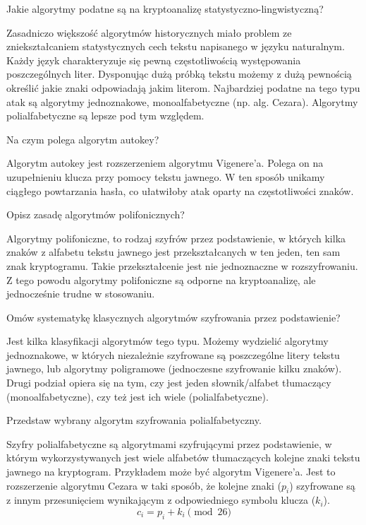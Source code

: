 \documentclass[answers,11pt]{exam}
\begin{document}
\begin{questions}
\question Jakie algorytmy podatne są na kryptoanalizę statystyczno-lingwistyczną?
\begin{solution}
Zasadniczo większość algorytmów historycznych miało problem ze zniekształcaniem statystycznych cech tekstu napisanego w języku naturalnym. Każdy język charakteryzuje się pewną częstotliwością występowania poszczególnych liter. Dysponując dużą próbką tekstu możemy z dużą pewnością określić jakie znaki odpowiadają jakim literom. Najbardziej podatne na tego typu atak są algorytmy jednoznakowe, monoalfabetyczne (np. alg. Cezara). Algorytmy polialfabetyczne są lepsze pod tym względem. 
\end{solution}

\question Na czym polega algorytm autokey?
\begin{solution}
Algorytm autokey jest rozszerzeniem algorytmu Vigenere'a. Polega on na uzupełnieniu klucza przy pomocy tekstu jawnego. W ten sposób unikamy ciągłego powtarzania hasła, co ułatwiłoby atak oparty na częstotliwości znaków. 
\end{solution}

\question Opisz zasadę algorytmów polifonicznych?
\begin{solution}
Algorytmy polifoniczne, to rodzaj szyfrów przez podstawienie, w których kilka znaków z alfabetu tekstu jawnego jest przekształcanych w ten jeden, ten sam znak kryptogramu. Takie przekształcenie jest nie jednoznaczne w rozszyfrowaniu. Z tego powodu algorytmy polifoniczne są odporne na kryptoanalizę, ale jednocześnie trudne w stosowaniu.
\end{solution}

\question Omów systematykę klasycznych algorytmów szyfrowania przez podstawienie?
\begin{solution}
Jest kilka klasyfikacji algorytmów tego typu. Możemy wydzielić algorytmy jednoznakowe, w których niezależnie szyfrowane są poszczególne litery tekstu jawnego, lub algorytmy poligramowe (jednoczesne szyfrowanie kilku znaków). 
Drugi podział opiera się na tym, czy jest jeden słownik/alfabet tłumaczący (monoalfabetyczne), czy też jest ich wiele (polialfabetyczne). 
\end{solution}

\question Przedstaw wybrany algorytm szyfrowania polialfabetyczny.
\begin{solution}
Szyfry polialfabetyczne są algorytmami szyfrującymi przez podstawienie, w którym wykorzystywanych jest wiele alfabetów tłumaczących kolejne znaki tekstu jawnego na kryptogram. Przykładem może być algorytm Vigenere'a. Jest to rozszerzenie algorytmu Cezara w taki sposób, że kolejne znaki  ($p_i$) szyfrowane są z innym przesunięciem wynikającym z odpowiedniego symbolu klucza ($k_i$).
\begin{equation}
c_i = p_i + k_i \pmod{26}
\end{equation}
\end{solution}


\end{questions}
\end{document}
